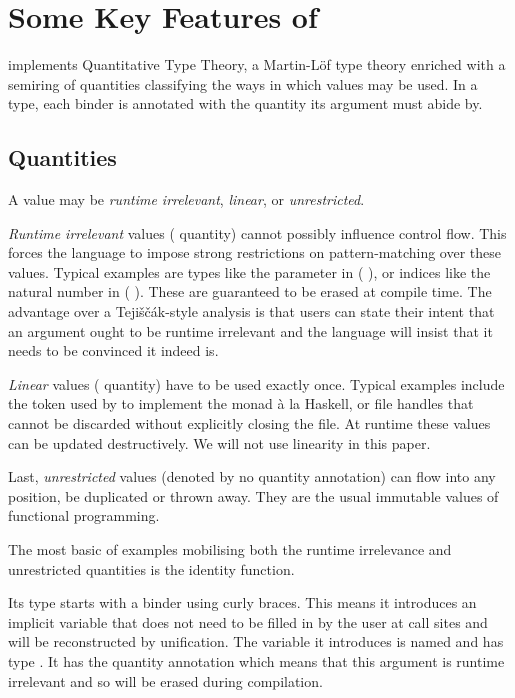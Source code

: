 
\section{Some Key Features of \idris}\label{sec:quantitativeTT}

\idris{} implements Quantitative Type Theory,
a Martin-Löf type theory enriched with a semiring of quantities
classifying the ways in which values may be used.
%
In a type, each binder is annotated with the quantity its argument must abide by.

\subsection{Quantities}

A value may be \emph{runtime irrelevant}, \emph{linear}, or \emph{unrestricted}.

\emph{Runtime irrelevant} values ( quantity) cannot possibly influence
control flow.
%
This forces the language to impose strong restrictions on pattern-matching over these
values.
%
Typical examples are types like the  parameter in ( ),
or indices like the natural number  in
(  ).
%
These are guaranteed to be erased at compile time. The advantage over a Tejiščák-style
analysis is that users can state their intent that an argument ought to be runtime
irrelevant and the language will insist that it needs to be convinced it indeed is.

\emph{Linear} values ( quantity) have to be used exactly once.
%
Typical examples include the  token used by \idris{} to implement the
 monad à la Haskell, or file handles that cannot be discarded without explicitly
closing the file.
%
At runtime these values can be updated destructively. We will not use linearity in this paper.

Last, \emph{unrestricted} values (denoted by no quantity annotation) can flow into any
position, be duplicated or thrown away.
%
They are the usual immutable values of functional programming.

The most basic of examples mobilising both the runtime irrelevance and unrestricted
quantities is the identity function.


Its type starts with a binder using curly braces. This means it introduces an implicit
variable that does not need to be filled in by the user at call sites and will be
reconstructed by unification. The variable it introduces is named  and
has type . It has the  quantity annotation which means
that this argument is runtime irrelevant and so will be erased during compilation.

